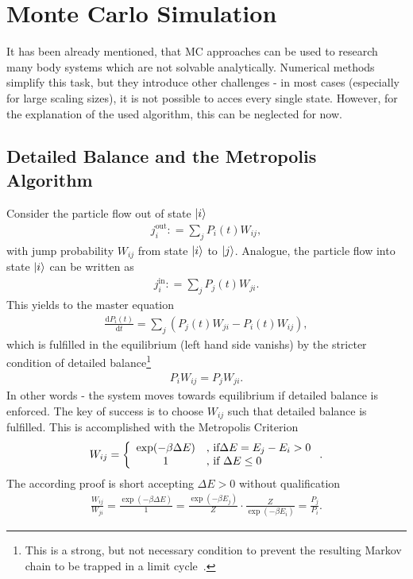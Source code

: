 \section{Monte Carlo Simulation}
It has been already mentioned, that MC approaches can be used to research many body systems which are not solvable analytically.
Numerical methods simplify this task, but they introduce other challenges - in most cases (especially for large scaling sizes), it is not possible to acces every single state.
However, for the explanation of the used algorithm, this can be neglected for now.

\subsection{Detailed Balance and the Metropolis Algorithm}
Consider the particle flow out of state $\ket{i}$
\begin{align}
	j^\text{out}_{i} \mathrel{\mathop:}= \sum_j P_i(t) W_{ij},
\end{align}
with jump probability $W_{ij}$ from state $\ket{i}$ to $\ket{j}$.
Analogue, the particle flow into state $\ket{i}$ can be written as
\begin{align}
	j^\text{in}_{i} \mathrel{\mathop:}= \sum_j P_j(t) W_{ji}.
\end{align}
This yields to the master equation
\begin{align}
	\frac{\mathrm{d}P_i(t)}{\mathrm{d}t} = 
		\sum_{j}\left(P_j(t)W_{ji} - P_i(t)W_{ij}\right),
\end{align}
which is fulfilled in the equilibrium (left hand side vanishs) by the stricter condition of detailed balance\footnote{This is a strong, but not necessary condition to prevent the resulting Markov chain to be trapped in a limit cycle~\cite{newman1999monte}.}
\begin{align}
	P_iW_{ij} = P_jW_{ji}.
\end{align}
In other words - the system moves towards equilibrium if detailed balance is enforced.
The key of success is to choose $W_{ij}$ such that detailed balance is fulfilled.
This is accomplished with the Metropolis Criterion
\begin{align}
	W_{ij} = \left\{
		\begin{array}{c l}
			\exp(-\beta\Delta E)&\text{, if}\Delta E = E_j - E_i > 0\\
			1										&\text{, if }\Delta E \leq 0 
		\end{array}\right..
\end{align}
The according proof is short accepting $\Delta E > 0$ without qualification
\begin{align} 
	\frac{W_{ij}}{W_{ji}} = \frac{\exp\left(-\beta\Delta E\right)}{1} = \frac{\exp(-\beta E_j)}{Z}\cdot\frac{Z}{\exp(-\beta E_i)} = \frac{P_j}{P_i}.
\end{align}

